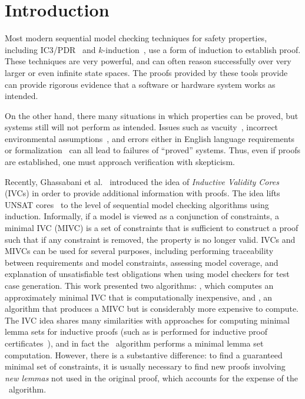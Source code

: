 \section{Introduction}
\label{sec:intro}
Most modern sequential model checking techniques for safety properties, including IC3/PDR~\cite{Een2011:PDR} and $k$-induction~\cite{SheeranSS00}, use a form of induction to establish proof.  These techniques are very powerful, and can often reason successfully over very larger or even infinite state spaces.  The proofs provided by these tools provide can provide rigorous evidence that a software or hardware system works as intended.

On the other hand, there many situations in which properties can be proved, but systems still will not perform as intended.  Issues such as vacuity~\cite{Kupferman03:Vacuity}, incorrect environmental assumptions~\cite{Whalen07:FMICS}, and errors either in English language requirements or formalization~\cite{Pike06:axioms} can all lead to failures of ``proved'' systems.  Thus, even if proofs are established, one must approach verification with skepticism.

Recently, Ghassabani et al.~\cite{Ghass16} introduced the idea of {\em Inductive Validity Cores} (IVCs) in order to provide additional information with proofs.  The idea lifts UNSAT cores~\cite{zhang2003extracting} to the level of sequential model checking algorithms using induction.  Informally, if a model is viewed as a conjunction of constraints, a minimal IVC (MIVC) is a set of constraints that is sufficient to construct a proof such that if any constraint is removed, the property is no longer valid. IVCs and MIVCs can be used for several purposes, including performing traceability between requirements and model constraints, assessing model coverage, and explanation of unsatisfiable test obligations when using model checkers for test case generation. This work presented two algorithms: \ucalg, which computes an approximately minimal IVC that is computationally inexpensive, and \ucbfalg,
an algorithm that produces a
MIVC but is considerably more expensive to compute.
%
The IVC idea shares many similarities with approaches for computing minimal lemma sets for inductive proofs (such as is performed for inductive proof certificates~\cite{piskac2016, ivrii2014small}), and in fact the \ucalg\ algorithm performs a minimal lemma set computation.  However, there is a substantive difference: to find a guaranteed minimal set of constraints, it is usually necessary to find new proofs involving {\em new lemmas} not used in the original proof, which accounts for the expense of the \ucbfalg\ algorithm.

